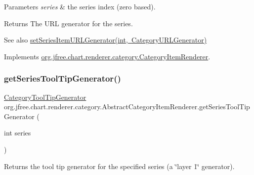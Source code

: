 \begin{DoxyParams}{Parameters}
{\em series} & the series index (zero based).\\
\hline
\end{DoxyParams}
\begin{DoxyReturn}{Returns}
The U\+RL generator for the series.
\end{DoxyReturn}
\begin{DoxySeeAlso}{See also}
\mbox{\hyperlink{classorg_1_1jfree_1_1chart_1_1renderer_1_1category_1_1_abstract_category_item_renderer_a8bd0eb808e40ecf16e77228655a0a99d}{set\+Series\+Item\+U\+R\+L\+Generator(int, Category\+U\+R\+L\+Generator)}} 
\end{DoxySeeAlso}


Implements \mbox{\hyperlink{interfaceorg_1_1jfree_1_1chart_1_1renderer_1_1category_1_1_category_item_renderer_a64d80a830a7a1e182659b29054f9c4fb}{org.\+jfree.\+chart.\+renderer.\+category.\+Category\+Item\+Renderer}}.

\mbox{\label{classorg_1_1jfree_1_1chart_1_1renderer_1_1category_1_1_abstract_category_item_renderer_aacaf1b8c18bb07c8394b00a416f276ba}} 
\subsubsection{\texorpdfstring{get\+Series\+Tool\+Tip\+Generator()}{getSeriesToolTipGenerator()}}
{\footnotesize\ttfamily \mbox{\hyperlink{interfaceorg_1_1jfree_1_1chart_1_1labels_1_1_category_tool_tip_generator}{Category\+Tool\+Tip\+Generator}} org.\+jfree.\+chart.\+renderer.\+category.\+Abstract\+Category\+Item\+Renderer.\+get\+Series\+Tool\+Tip\+Generator (\begin{DoxyParamCaption}\item[{int}]{series }\end{DoxyParamCaption})}

Returns the tool tip generator for the specified series (a \char`\"{}layer 1\char`\"{} generator).


